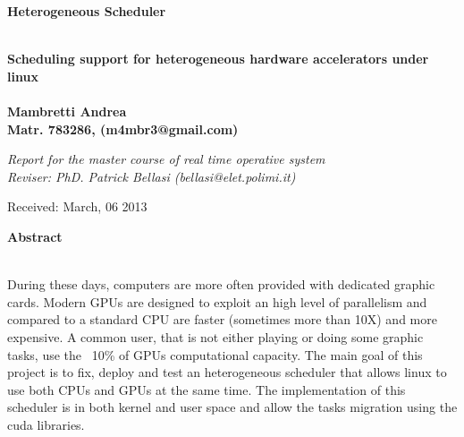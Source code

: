 \documentclass[a4paper,13pt]{article}
\newenvironment*{mytitle}{\begin{LARGE}\bf}{\end{LARGE}\\}%
\newenvironment*{mysubtitle}{\bf}{\\[1.5ex]}%
\newenvironment*{myabstract}{\begin{Large}\bf}{\end{Large}\\[2.5ex]}%
\begin{document}
\begin{mytitle}Heterogeneous Scheduler\end{mytitle}
\begin{mysubtitle}Scheduling support for heterogeneous hardware accelerators under linux\end{mysubtitle}
%
%
\\
Mambretti Andrea\\
Matr. 783286, (m4mbr3@gmail.com)\\
\begin{flushright}
\emph{Report for the master course of real time operative system}\\
\emph{Reviser: PhD. Patrick Bellasi (bellasi@elet.polimi.it)}
\end{flushright}

Received: March, 06 2013\\
\hspace{10ex}

\begin{myabstract} Abstract \end{myabstract}
During these days, computers are more often provided with dedicated graphic cards. Modern GPUs are
designed to exploit an high level of parallelism and compared to a standard CPU are faster
 (sometimes more than 10X) and more expensive. 
A common user, that is not either playing or doing some graphic tasks, use the ~10\% of GPUs 
computational capacity. The main goal of this project is to fix, deploy and test an heterogeneous 
scheduler that allows linux to use both CPUs and GPUs at the same time. The implementation of this 
scheduler is in both kernel and user space and allow the tasks migration using the cuda libraries.
\end{document}
